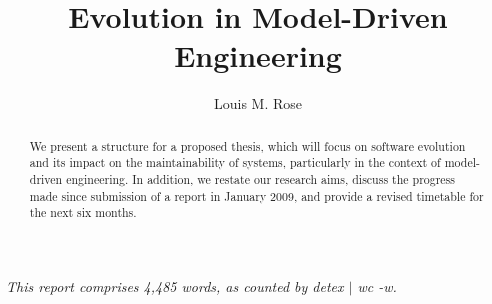 \documentclass[a4paper,10pt]{article}
\title{Evolution in Model-Driven Engineering}
\author{Louis M. Rose}
\begin{document}
\maketitle

\begin{abstract}
We present a structure for a proposed thesis, which will focus on software evolution and its impact on the maintainability of systems, particularly in the context of model-driven engineering. In addition, we restate our research aims, discuss the progress made since submission of a report in January 2009, and provide a revised timetable for the next six months.
\end{abstract}

\vspace{2mm}

\begin{center}
  \small{\textit{This report comprises 4,485 words, as counted by detex $|$ wc -w.}}
\end{center}

\tableofcontents

\newpage







\end{document}
